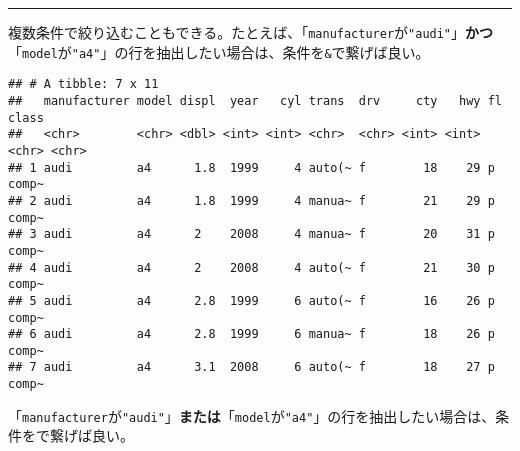 \documentclass[]{book}
\newenvironment{Shaded}{\begin{snugshade}}{\end{snugshade}}
\newcommand{\KeywordTok}[1]{\textcolor[rgb]{0.13,0.29,0.53}{\textbf{#1}}}
\newcommand{\StringTok}[1]{\textcolor[rgb]{0.31,0.60,0.02}{#1}}
\newcommand{\OperatorTok}[1]{\textcolor[rgb]{0.81,0.36,0.00}{\textbf{#1}}}
\newcommand{\NormalTok}[1]{#1}
\begin{document}
\begin{center}\rule{0.5\linewidth}{\linethickness}\end{center}

複数条件で絞り込むこともできる。たとえば、「\texttt{manufacturer}が\texttt{"audi"}」\textbf{かつ}「\texttt{model}が\texttt{"a4"}」の行を抽出したい場合は、条件を\texttt{\&}で繋げば良い。

\begin{Shaded}
\end{Shaded}

\begin{verbatim}
## # A tibble: 7 x 11
##   manufacturer model displ  year   cyl trans  drv     cty   hwy fl    class
##   <chr>        <chr> <dbl> <int> <int> <chr>  <chr> <int> <int> <chr> <chr>
## 1 audi         a4      1.8  1999     4 auto(~ f        18    29 p     comp~
## 2 audi         a4      1.8  1999     4 manua~ f        21    29 p     comp~
## 3 audi         a4      2    2008     4 manua~ f        20    31 p     comp~
## 4 audi         a4      2    2008     4 auto(~ f        21    30 p     comp~
## 5 audi         a4      2.8  1999     6 auto(~ f        16    26 p     comp~
## 6 audi         a4      2.8  1999     6 manua~ f        18    26 p     comp~
## 7 audi         a4      3.1  2008     6 auto(~ f        18    27 p     comp~
\end{verbatim}

「\texttt{manufacturer}が\texttt{"audi"}」\textbf{または}「\texttt{model}が\texttt{"a4"}」の行を抽出したい場合は、条件を\texttt{\textbar{}}で繋げば良い。

\begin{Shaded}
\end{Shaded}
\end{document}
